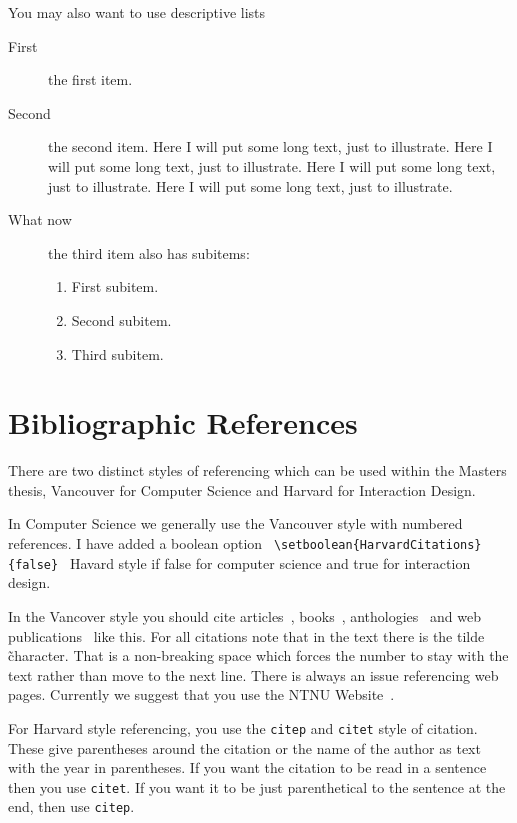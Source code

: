 You may also want to use descriptive lists
\begin{description}
	\item[First] the first item.
	\item[Second] the second item. Here I will put some long text, just to illustrate.
	  Here I will put some long text, just to illustrate. Here I will put
	  some long text, just to illustrate. Here I will put some long text,
	  just to illustrate.
	\item [What now] the third item also has subitems:
	  \begin{enumerate}
		  \item First subitem.
		  \item Second subitem.
		  \item Third subitem.
	  \end{enumerate}
\end{description}


\section{Bibliographic References}

There are two distinct styles of referencing which can be used within the Masters thesis, Vancouver for Computer Science and Harvard for Interaction Design.

In Computer Science we generally use the Vancouver style with numbered references.  
I have added a boolean option \verb| \setboolean{HarvardCitations}{false} |  Havard style if false for computer science and true for interaction design.
 
In the Vancover style you should cite articles~\cite{Askvall1985}, books~\cite{Card1983},
anthologies~\cite{Lancaster1985} and web publications~\cite{Meldon1997}
like this. For all citations note that in the text there is the tilde \~ character.  
That is a non-breaking space which forces the number to stay with the text rather than move to the next line.
There is always an issue referencing web pages. Currently
we suggest that you use the NTNU Website~\cite{NTNU:Website}.


For Harvard style referencing, you use the \texttt{citep} and \texttt{citet} style of citation. 
These give parentheses around the citation or the name of the author as text with the year in parentheses.  
If you want the citation to be read in a sentence then you use  \texttt{citet}. 
If you want it to be just parenthetical to the sentence at the end, then use \texttt{citep}.


